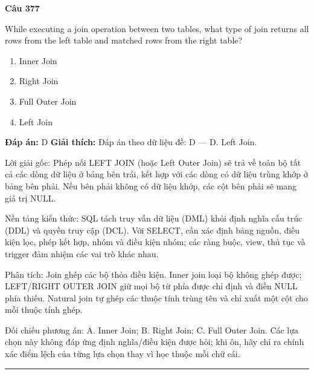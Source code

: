 \documentclass[11pt,a4paper]{article}
\newenvironment{question}[1]{%
  \par\vspace{1em}\noindent\textbf{\large Câu #1}\par\vspace{0.4em}
}{%
  \par\vspace{1em}\hrule\vspace{0.6em}
}
\newenvironment{choices}{%
  \begin{enumerate}[label=\textbf{\Alph*.},leftmargin=2.2em,itemsep=2pt,topsep=3pt]
}{%
  \end{enumerate}
}
\newcommand{\choice}{\item}
\begin{document}
\begin{question}{377}
While executing a join operation between two tables, what type of join returns all rows from the left table and matched rows from the right table?
\begin{choices}
\choice Inner Join
\choice Right Join
\choice Full Outer Join
\choice Left Join
\end{choices}
\textbf{Đáp án:} D
\textbf{Giải thích:} Đáp án theo dữ liệu đề: D — D. Left Join.

Lời giải gốc: Phép nối LEFT JOIN (hoặc Left Outer Join) sẽ trả về toàn bộ tất cả các dòng dữ liệu ở bảng bên trái, kết hợp với các dòng có dữ liệu trùng khớp ở bảng bên phải. Nếu bên phải không có dữ liệu khớp, các cột bên phải sẽ mang giá trị NULL.

Nền tảng kiến thức: SQL tách truy vấn dữ liệu (DML) khỏi định nghĩa cấu trúc (DDL) và quyền truy cập (DCL). Với SELECT, cần xác định bảng nguồn, điều kiện lọc, phép kết hợp, nhóm và điều kiện nhóm; các ràng buộc, view, thủ tục và trigger đảm nhiệm các vai trò khác nhau.

Phân tích: Join ghép các bộ thỏa điều kiện. Inner join loại bộ không ghép được; LEFT/RIGHT OUTER JOIN giữ mọi bộ từ phía được chỉ định và điền NULL phía thiếu. Natural join tự ghép các thuộc tính trùng tên và chỉ xuất một cột cho mỗi thuộc tính ghép.

Đối chiếu phương án: A. Inner Join; B. Right Join; C. Full Outer Join. Các lựa chọn này không đáp ứng định nghĩa/điều kiện được hỏi; khi ôn, hãy chỉ ra chính xác điểm lệch của từng lựa chọn thay vì học thuộc mỗi chữ cái.
\end{question}
\end{document}
